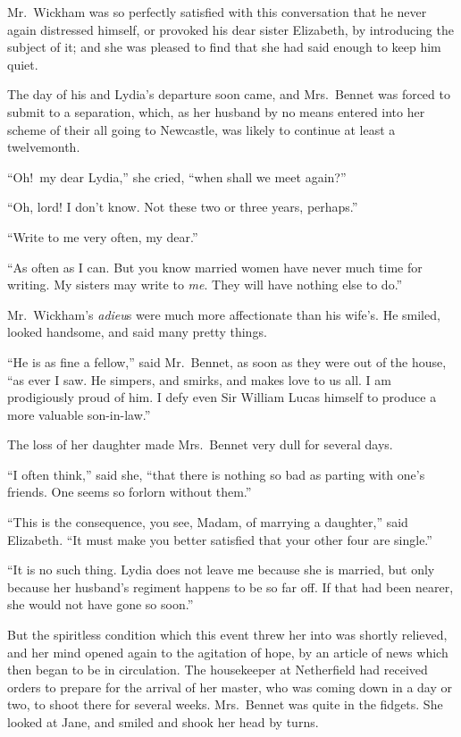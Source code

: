 \documentclass[12pt,english]{book}
\begin{document}


Mr.\ Wickham was so perfectly satisfied with this conversation that
he never again distressed himself, or provoked his dear sister Elizabeth,
by introducing the subject of it; and she was pleased to find that
she had said enough to keep him quiet.

The day of his and Lydia's departure soon came, and Mrs.\ Bennet
was forced to submit to a separation, which, as her husband by no
means entered into her scheme of their all going to Newcastle, was
likely to continue at least a twelvemonth.

{}``Oh!\ my dear Lydia,'' she cried, {}``when shall we meet again?''\ 

{}``Oh, lord! I don't know. Not these two or three years, perhaps.''

{}``Write to me very often, my dear.''

{}``As often as I can. But you know married women have never much
time for writing. My sisters may write to \textit{me}. They will have
nothing else to do.''

Mr.\ Wickham's \emph{adieu}s were much more affectionate than his
wife's. He smiled, looked handsome, and said many pretty things.

{}``He is as fine a fellow,'' said Mr.\ Bennet, as soon as they
were out of the house, {}``as ever I saw. He simpers, and smirks,
and makes love to us all. I am prodigiously proud of him. I defy even
Sir William Lucas himself to produce a more valuable son-in-law.''

The loss of her daughter made Mrs.\ Bennet very dull for several
days.

{}``I often think,'' said she, {}``that there is nothing so bad
as parting with one's friends. One seems so forlorn without them.''

{}``This is the consequence, you see, Madam, of marrying a daughter,''
said Elizabeth. {}``It must make you better satisfied that your other
four are single.''

{}``It is no such thing. Lydia does not leave me because she is married,
but only because her husband's regiment happens to be so far off.
If that had been nearer, she would not have gone so soon.''

But the spiritless condition which this event threw her into was shortly
relieved, and her mind opened again to the agitation of hope, by an
article of news which then began to be in circulation. The housekeeper
at Netherfield had received orders to prepare for the arrival of her
master, who was coming down in a day or two, to shoot there for several
weeks. Mrs.\ Bennet was quite in the fidgets. She looked at Jane,
and smiled and shook her head by turns.
\end{document}
